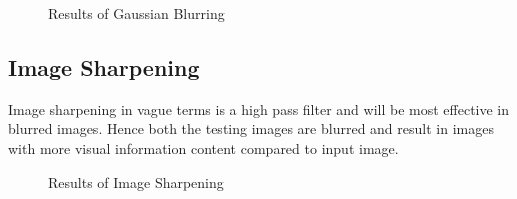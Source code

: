 \documentclass[letterpaper, 10 pt, conference]{ieeeconf}  %
\begin{document}
\begin{figure}[h!]%
	\centering
    \qquad
    \caption{Results of Gaussian Blurring}%
    \label{fig:image_blur2}%
\end{figure}

\subsection{\textbf{Image Sharpening}}
Image sharpening in vague terms is a high pass filter and will be most effective in blurred images. Hence both the testing images are blurred and result in images with more visual information content compared to input image. 

\begin{figure}[h!]%
	\centering
    \qquad
    \caption{Results of Image Sharpening}%
    \label{fig:image_sharp1}%
\end{figure}
\end{document}
